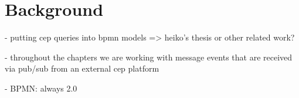 \chapter{Background}\label{ch:background}

- putting cep queries into bpmn models => heiko's thesis or other related work?

- throughout the chapters we are working with message events that are received via pub/sub from an external cep platform

- BPMN: always 2.0